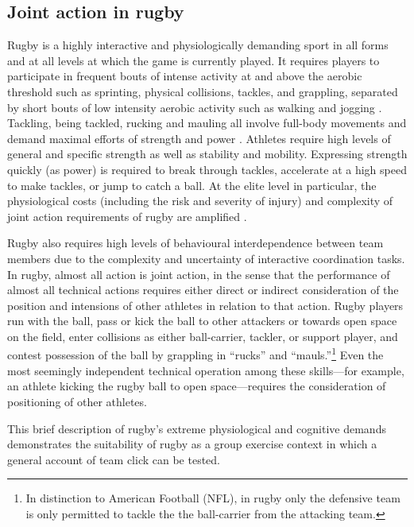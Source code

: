 \begin{CJK}{UTF8}{gbsn}
\subsection{Joint action in rugby \label{sect:jointActionRugby}}
Rugby is a highly interactive and physiologically demanding sport in all forms and at all levels at which the game is currently played.  It requires players to participate in frequent bouts of intense activity at and above the aerobic threshold such as sprinting, physical collisions, tackles, and grappling, separated by short bouts of low intensity aerobic activity such as walking and jogging \cite{Duthie2003}.  Tackling, being tackled, rucking and mauling all involve full-body movements and demand maximal efforts of strength and power \citep{Elloumi2012}.  Athletes require high levels of general and specific strength as well as stability and mobility.  Expressing strength quickly (as power) is required to break through tackles, accelerate at a high speed to make tackles, or jump to catch a ball.  At the elite level in particular, the physiological costs (including the risk and severity of injury) and complexity of joint action requirements of rugby are amplified \citep{Coughlan2011}.

Rugby also requires high levels of behavioural interdependence between team members due to the complexity and uncertainty of interactive coordination tasks. In rugby, almost all action is joint action, in the sense that the performance of almost all technical actions requires either direct or indirect consideration of the position and intensions of other athletes in relation to that action.  Rugby players run with the ball, pass or kick the ball to other attackers or towards open space on the field, enter collisions as either ball-carrier, tackler, or support player, and contest possession of the ball by grappling in ``rucks'' and ``mauls.''\footnote{In distinction to American Football (NFL), in rugby only the defensive team is only permitted to tackle the the ball-carrier from the attacking team.}  Even the most seemingly independent technical operation among these skills---for example, an athlete kicking the rugby ball to open space---requires the consideration of positioning of other athletes.

This brief description of rugby's extreme physiological and cognitive demands demonstrates the suitability of rugby as a group exercise context in which a general account of team click can be tested.


\end{CJK}
